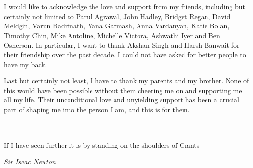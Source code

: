 I would like to acknowledge the love and support from my friends, including but certainly not limited to Parul Agrawal, John Hadley, Bridget Regan, David Meldgin, Varun Badrinath, Yana Garmash, Anna Vardanyan, Katie Bolan, Timothy Chin, Mike Antoline, Michelle Victora, Ashwathi Iyer and Ben Osherson.
In particular, I want to thank Akshan Singh and Harsh Banwait for their friendship over the past decade.
I could not have asked for better people to have my back.

Last but certainly not least, I have to thank my parents and my brother.
None of this would have been possible without them cheering me on and supporting me all my life.
Their unconditional love and unyielding support has been a crucial part of shaping me into the person I am, and this is for them. \\ \\ \\ 



\epigraph{If I have seen further it is by standing on the shoulders of Giants}{\textit{Sir Isaac Newton}}